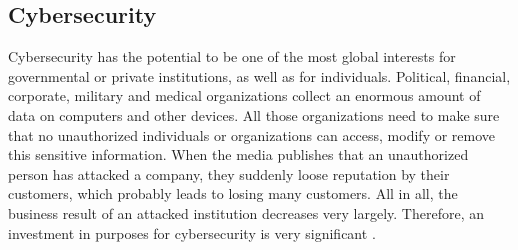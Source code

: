 \subsection{Cybersecurity}
\label{subsec:02_cybersecurity}

Cybersecurity has the potential to be one of the most global interests for governmental or private institutions, as well as for individuals. Political, financial, corporate, military and medical organizations collect an enormous amount of data on computers and other devices. All those organizations need to make sure that no unauthorized individuals or organizations can access, modify or remove this sensitive information. When the media publishes that an unauthorized person has attacked a company, they suddenly loose reputation by their customers, which probably leads to losing many customers. All in all, the business result of an attacked institution decreases very largely. Therefore, an investment in purposes for cybersecurity is very significant \cite{Bishop2003}.

